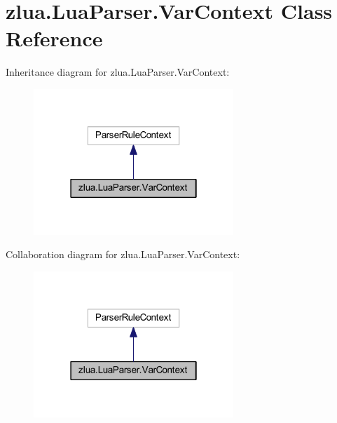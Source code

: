 \hypertarget{classzlua_1_1_lua_parser_1_1_var_context}{}\section{zlua.\+Lua\+Parser.\+Var\+Context Class Reference}
\label{classzlua_1_1_lua_parser_1_1_var_context}


Inheritance diagram for zlua.\+Lua\+Parser.\+Var\+Context\+:
\nopagebreak
\begin{figure}[H]
\begin{center}
\leavevmode
\includegraphics[width=214pt]{classzlua_1_1_lua_parser_1_1_var_context__inherit__graph}
\end{center}
\end{figure}


Collaboration diagram for zlua.\+Lua\+Parser.\+Var\+Context\+:
\nopagebreak
\begin{figure}[H]
\begin{center}
\leavevmode
\includegraphics[width=214pt]{classzlua_1_1_lua_parser_1_1_var_context__coll__graph}
\end{center}
\end{figure}
